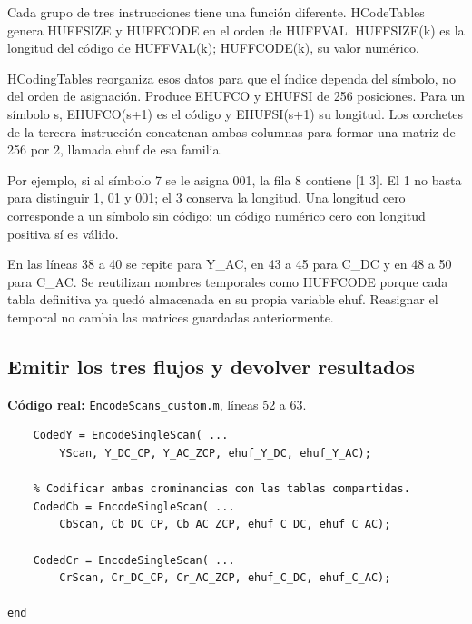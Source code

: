 \documentclass[11pt,a4paper,oneside]{report}
\begin{document}
Cada grupo de tres instrucciones tiene una función diferente. HCodeTables
genera HUFFSIZE y HUFFCODE en el orden de HUFFVAL. HUFFSIZE(k) es la longitud
del código de HUFFVAL(k); HUFFCODE(k), su valor numérico.

HCodingTables reorganiza esos datos para que el índice dependa del símbolo,
no del orden de asignación. Produce EHUFCO y EHUFSI de 256 posiciones.
Para un símbolo s, EHUFCO(s+1) es el código y EHUFSI(s+1) su longitud.
Los corchetes de la tercera instrucción concatenan ambas columnas para
formar una matriz de 256 por 2, llamada ehuf de esa familia.

Por ejemplo, si al símbolo 7 se le asigna 001, la fila 8 contiene [1 3].
El 1 no basta para distinguir 1, 01 y 001; el 3 conserva la longitud. Una
longitud cero corresponde a un símbolo sin código; un código numérico cero
con longitud positiva sí es válido.

En las líneas 38 a 40 se repite para Y\_AC, en 43 a 45 para C\_DC y en
48 a 50 para C\_AC. Se reutilizan nombres temporales como HUFFCODE porque
cada tabla definitiva ya quedó almacenada en su propia variable ehuf.
Reasignar el temporal no cambia las matrices guardadas anteriormente.


\par\medskip\noindent\begin{minipage}{\linewidth}

\subsection{Emitir los tres flujos y devolver resultados}

\textbf{Código real:} \texttt{EncodeScans\_custom.m}, líneas 52 a 63.

\begin{lstlisting}[firstnumber=52]
    % Codificar luminancia con sus tablas DC y AC.
    CodedY = EncodeSingleScan( ...
        YScan, Y_DC_CP, Y_AC_ZCP, ehuf_Y_DC, ehuf_Y_AC);

    % Codificar ambas crominancias con las tablas compartidas.
    CodedCb = EncodeSingleScan( ...
        CbScan, Cb_DC_CP, Cb_AC_ZCP, ehuf_C_DC, ehuf_C_AC);

    CodedCr = EncodeSingleScan( ...
        CrScan, Cr_DC_CP, Cr_AC_ZCP, ehuf_C_DC, ehuf_C_AC);

end
\end{lstlisting}

\end{minipage}\par
\end{document}
